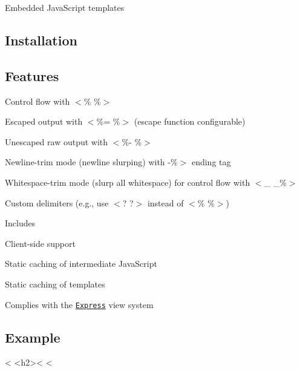Embedded Java\+Script templates

\href{https://travis-ci.org/mde/ejs}{\tt } \href{https://david-dm.org/mde/ejs?type=dev}{\tt } \href{https://snyk.io/test/npm/ejs}{\tt }

\subsection*{Installation}




\subsection*{Features}


\begin{DoxyItemize}
\item Control flow with {\ttfamily $<$\% \%$>$}
\item Escaped output with {\ttfamily $<$\%= \%$>$} (escape function configurable)
\item Unescaped raw output with {\ttfamily $<$\%-\/ \%$>$}
\item Newline-\/trim mode (\textquotesingle{}newline slurping\textquotesingle{}) with {\ttfamily -\/\%$>$} ending tag
\item Whitespace-\/trim mode (slurp all whitespace) for control flow with {\ttfamily $<$\+\_\+ \+\_\+\%$>$}
\item Custom delimiters (e.\+g., use {\ttfamily $<$? ?$>$} instead of {\ttfamily $<$\% \%$>$})
\item Includes
\item Client-\/side support
\item Static caching of intermediate Java\+Script
\item Static caching of templates
\item Complies with the \href{http://expressjs.com}{\tt Express} view system
\end{DoxyItemize}

\subsection*{Example}


\begin{DoxyCode}
<%
  <h2><%
<%
\end{DoxyCode}


